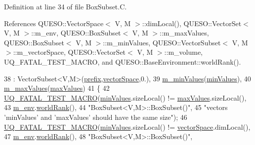 Definition at line 34 of file Box\-Subset.\-C.



References Q\-U\-E\-S\-O\-::\-Vector\-Space$<$ V, M $>$\-::dim\-Local(), Q\-U\-E\-S\-O\-::\-Vector\-Set$<$ V, M $>$\-::m\-\_\-env, Q\-U\-E\-S\-O\-::\-Box\-Subset$<$ V, M $>$\-::m\-\_\-max\-Values, Q\-U\-E\-S\-O\-::\-Box\-Subset$<$ V, M $>$\-::m\-\_\-min\-Values, Q\-U\-E\-S\-O\-::\-Vector\-Subset$<$ V, M $>$\-::m\-\_\-vector\-Space, Q\-U\-E\-S\-O\-::\-Vector\-Set$<$ V, M $>$\-::m\-\_\-volume, U\-Q\-\_\-\-F\-A\-T\-A\-L\-\_\-\-T\-E\-S\-T\-\_\-\-M\-A\-C\-R\-O, and Q\-U\-E\-S\-O\-::\-Base\-Environment\-::world\-Rank().


\begin{DoxyCode}
38   : VectorSubset<V,M>(\hyperlink{class_q_u_e_s_o_1_1_vector_set_aedcd4b0f502af4c6e6df863c13cddfec}{prefix},\hyperlink{class_q_u_e_s_o_1_1_vector_subset_afc859b5206bc056c66893c854c191959}{vectorSpace},0.),
39     \hyperlink{class_q_u_e_s_o_1_1_box_subset_a633a4fbfa03590b38e4d2b192f3cc2b5}{m\_minValues}(\hyperlink{class_q_u_e_s_o_1_1_box_subset_a57d3ba7df60a38abc4c161ff78f4a567}{minValues}),
40     \hyperlink{class_q_u_e_s_o_1_1_box_subset_ad234b8d38a236fb5c0d1353302c3e2f5}{m\_maxValues}(\hyperlink{class_q_u_e_s_o_1_1_box_subset_a47616371623019a8c6399d5b3661d25b}{maxValues})
41 \{
42   \hyperlink{_defines_8h_a56d63d18d0a6d45757de47fcc06f574d}{UQ\_FATAL\_TEST\_MACRO}(\hyperlink{class_q_u_e_s_o_1_1_box_subset_a57d3ba7df60a38abc4c161ff78f4a567}{minValues}.sizeLocal() != 
      \hyperlink{class_q_u_e_s_o_1_1_box_subset_a47616371623019a8c6399d5b3661d25b}{maxValues}.sizeLocal(),
43                       \hyperlink{class_q_u_e_s_o_1_1_vector_set_a77f3b57109bc1d89b4111f47458df770}{m\_env}.\hyperlink{class_q_u_e_s_o_1_1_base_environment_a78b57112bbd0e6dd0e8afec00b40ffa7}{worldRank}(),
44                       \textcolor{stringliteral}{"BoxSubset<V,M>::BoxSubset()"},
45                       \textcolor{stringliteral}{"vectors 'minValues' and 'maxValues' should have the same size"});
46   \hyperlink{_defines_8h_a56d63d18d0a6d45757de47fcc06f574d}{UQ\_FATAL\_TEST\_MACRO}(\hyperlink{class_q_u_e_s_o_1_1_box_subset_a57d3ba7df60a38abc4c161ff78f4a567}{minValues}.sizeLocal() != 
      \hyperlink{class_q_u_e_s_o_1_1_vector_subset_afc859b5206bc056c66893c854c191959}{vectorSpace}.dimLocal(),
47                       \hyperlink{class_q_u_e_s_o_1_1_vector_set_a77f3b57109bc1d89b4111f47458df770}{m\_env}.\hyperlink{class_q_u_e_s_o_1_1_base_environment_a78b57112bbd0e6dd0e8afec00b40ffa7}{worldRank}(),
48                       \textcolor{stringliteral}{"BoxSubset<V,M>::BoxSubset()"},

\end{DoxyCode}
